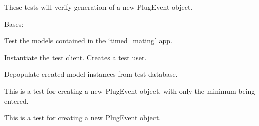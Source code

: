 \documentclass[letterpaper,10pt,english]{sphinxmanual}
\begin{document}
These tests will verify generation of a new PlugEvent object.

\begin{fulllineitems}
\label{api:mousedb.timed_mating.tests.Timed_MatingModelTests}
Bases: 

Test the models contained in the `timed\_mating' app.

\begin{fulllineitems}
\label{api:mousedb.timed_mating.tests.Timed_MatingModelTests.setUp}
Instantiate the test client.  Creates a test user.

\end{fulllineitems}


\begin{fulllineitems}
\label{api:mousedb.timed_mating.tests.Timed_MatingModelTests.tearDown}
Depopulate created model instances from test database.

\end{fulllineitems}


\begin{fulllineitems}
\label{api:mousedb.timed_mating.tests.Timed_MatingModelTests.test_create_plugevent_minimal}
This is a test for creating a new PlugEvent object, with only the minimum being entered.

\end{fulllineitems}


\begin{fulllineitems}
\label{api:mousedb.timed_mating.tests.Timed_MatingModelTests.test_create_plugevent_most_fields}
This is a test for creating a new PlugEvent object.


\end{fulllineitems}
\end{fulllineitems}
\end{document}
